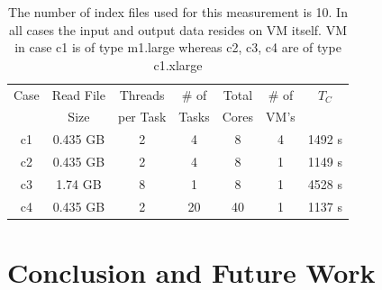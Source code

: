 \documentclass{sig-alternate}
\begin{document}


 \begin{table}
 \small
 \begin{tabular}{|c|c|c|c|c|c|c|} 
 \hline 
 Case&Read File&Threads  & \# of & Total & \# of  &  $T_C$  \\ 
     & Size  & per Task & Tasks & Cores &  VM's & \\ 
\hline

c1& 0.435 GB&2 &  4 & 8 & 4 & 1492 s\\
c2 &0.435 GB & 2 & 4  & 8  & 1 &1149 s\\ 
c3 & 1.74 GB &8 & 1 &  8 & 1 &4528 s \\\hline
\hline
c4 & 0.435 GB&2 & 20 & 40 & 1 &1137 s \\
\hline

 \end{tabular}

 \caption{ The number of index files used for this measurement is 10.
   In all cases the input and output data resides on VM itself.  VM in
   case c1 is of type m1.large whereas c2, c3, c4 are of type
   c1.xlarge }
  \label{table:cloud-VM} 
\end{table}



\section{Conclusion and Future Work}
\end{document}
